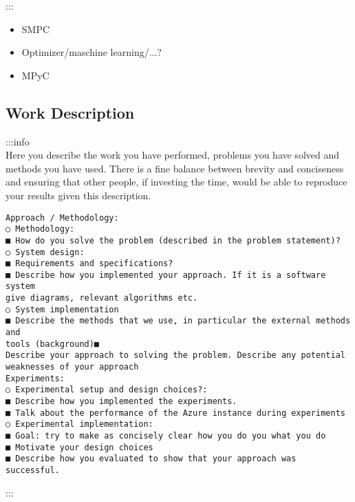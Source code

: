 \documentclass[
]{article}
\begin{document}
:::

\begin{itemize}
\item
  SMPC
\item
  Optimizer/maschine learning/...?
\item
  MPyC
\end{itemize}

\hypertarget{header-n55}{%
\subsection{Work Description}\label{header-n55}}

:::info\\
Here you describe the work you have performed, problems you have solved
and methods you have used. There is a fine balance between brevity and
conciseness and ensuring that other people, if investing the time, would
be able to reproduce your results given this description.

\begin{verbatim}
Approach / Methodology:
○ Methodology:
■ How do you solve the problem (described in the problem statement)?
○ System design:
■ Requirements and specifications?
■ Describe how you implemented your approach. If it is a software system
give diagrams, relevant algorithms etc.
○ System implementation
■ Describe the methods that we use, in particular the external methods and
tools (background)■
Describe your approach to solving the problem. Describe any potential
weaknesses of your approach
Experiments:
○ Experimental setup and design choices?:
■ Describe how you implemented the experiments.
■ Talk about the performance of the Azure instance during experiments
○ Experimental implementation:
■ Goal: try to make as concisely clear how you do you what you do
■ Motivate your design choices
■ Describe how you evaluated to show that your approach was successful.
\end{verbatim}

:::
\end{document}
